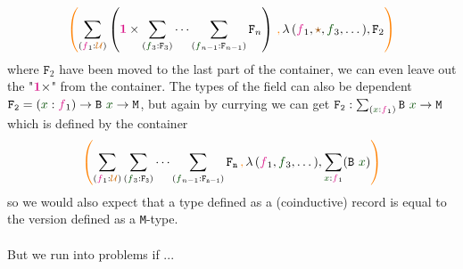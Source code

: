 \documentclass[twoside,11pt,openright]{report}
\theoremstyle{plain} %
\theoremstyle{definition}
\theoremstyle{remark}
\newcommand*{\term}[1]{\textcolor{green!30!black}{#1}} %
\newcommand*{\type}[1]{\textcolor{magenta!90!black}{#1}}
\newcommand*{\containerpair}[2]{\ensuremath{\colorlet{savedleftcolor}{.}\color{orange}\left(\color{savedleftcolor}#1\,\textcolor{orange}{\mathbf{,}}\,#2\color{orange}\right)\color{savedleftcolor}}}
\newcommand*{\universe}[1]{\textcolor{orange!80!black}{#1}}
\newcommand*{\unit}{\type{\textbf{1}}}
\newcommand*{\constant}[1]{\textcolor{orange!60!black}{\ensuremath{\mathtt{#1}}}}
\newcommand*{\typeformer}[1]{\ensuremath{\mathtt{#1}}}
\newcommand*{\unitelem}{\constant{\star}} %
\begin{document}
\begin{equation}
  \containerpair{\sum_{(\type{f}_1 : \universe{\mathcal{U}})} \left(\unit \times \sum_{(\term{f}_3 : \typeformer{F}_3)} \cdots \sum_{(\term{f}_{n-1} : \typeformer{F}_{n-1})}\typeformer{F}_n\right)}{\lambda\,(\type{f}_1,\unitelem,\term{f}_3,\dots),\typeformer{F}_2}
\end{equation}
where \(\typeformer{F}_2\) have been moved to the last part of the container, we can even leave out the "\(\unit \times\)" from the container. The types of the field can also be dependent \(\typeformer{F_2} = (\term{x} : \type{f}_1) \rightarrow \typeformer{B}~\term{x} \rightarrow \mathtt{M}\), but again by currying we can get \(\typeformer{F_2} : \sum_{(\term{x} : \type{f}_1)} \typeformer{B}~\term{x} \rightarrow \mathtt{M}\) which is defined by the container
\begin{equation}
  \containerpair{\sum_{(\type{f}_1 : \universe{\mathcal{U}})} \sum_{(\term{f}_3 : \typeformer{F_3})} \cdots \sum_{(\term{f}_{n-1} : \typeformer{F_{n-1}})}\typeformer{F_n}}{\lambda\,(\type{f}_1,\term{f}_3,\dots),\sum_{\term{x} : \type{f}_1} (\typeformer{B}~\term{x})}
\end{equation}
so we would also expect that a type defined as a (coinductive) record is equal to the version defined as a \texttt{M}-type. 
\\ \\
But we run into problems if ...  
\end{document}

